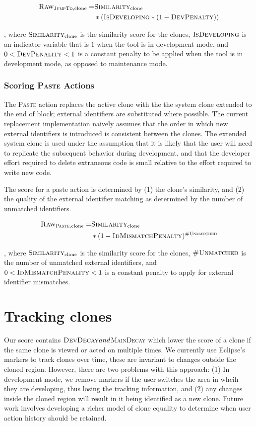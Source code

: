 \documentclass[nocopyrightspace,10pt]{sigplanconf}
\begin{document}
\begin{align*}
  \textsc{Raw}_{\textsc{JumpTo}, \text{clone}} = & \textsc{Similarity}_{\text{clone}} \\ 
   & * (\textsc{IsDeveloping} * (1 - \textsc{DevPenalty}))
\end{align*}

\noindent, where $\textsc{Similarity}_{\text{clone}}$ is the
similarity score for the clones, $\textsc{IsDeveloping}$ is an
indicator variable that is $1$ when the tool is in development mode,
and $0 < \textsc{DevPenality} < 1$ is a constant penalty to be applied
when the tool is in development mode, as opposed to maintenance mode.

\subsubsection{Scoring \textsc{Paste} Actions}
The \textsc{Paste} action replaces the active clone with the the
system clone extended to the end of block; external identifiers are
substituted where possible. The current replacement implementation
naively assumes that the order in which new external identifiers is
introduced is consistent between the clones.  The extended system
clone is used under the assumption that it is likely that the user
will need to replicate the subsequent behavior during development, and
that the developer effort required to delete extraneous code is small
relative to the effort required to write new code.

The score for a paste action is determined by (1) the clone's
similarity, and (2) the quality of the external identifier matching as
determined by the number of unmatched identifiers.

\begin{align*}
  \textsc{Raw}_{\textsc{Paste}, \text{clone}} = & \textsc{Similarity}_{\text{clone}} \\ 
   & * (1 - \textsc{IdMismatchPenalty})^{\textsc{\#Unmatched}}
\end{align*}

\noindent, where $\textsc{Similarity}_{\text{clone}}$ is the
similarity score for the clones, $\textsc{\#Unmatched}$ is the number
of unmatched external identifiers, and $0 <
\textsc{IdMismatchPenality} < 1$ is a constant penalty to apply for
external identifier mismatches.

\section{Tracking clones}
Our score contains $\textsc{DevDecay} and $\textsc{MainDecay} which lower
the score of a clone if the same clone is viewed or acted on multiple times.  We
currently use Eclipse's markers to track clones over time, these are invariant to 
changes outside the cloned region.  However, there are two problems with this 
approach: (1) In development mode, we remove markers if the user switches the 
area in whcih they are developing, thus losing the tracking information, and
(2) any changes inside the cloned region will result in it being identified as a new 
clone.  Future work involves developing a richer model of clone equality to determine 
when user action history should be retained.
\end{document}
